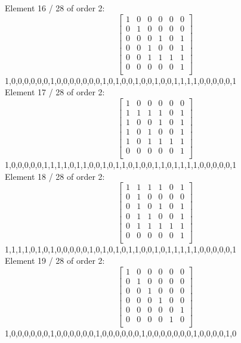 Element    16 / 28 of order 2:
$$
\left[
\begin{array}{*{6}{r}}
1 & 0 & 0 & 0 & 0 & 0\\
0 & 1 & 0 & 0 & 0 & 0\\
0 & 0 & 0 & 1 & 0 & 1\\
0 & 0 & 1 & 0 & 0 & 1\\
0 & 0 & 1 & 1 & 1 & 1\\
0 & 0 & 0 & 0 & 0 & 1\\
\end{array}
\right]
$$
1,0,0,0,0,0,0,1,0,0,0,0,0,0,0,1,0,1,0,0,1,0,0,1,0,0,1,1,1,1,0,0,0,0,0,1\\
Element    17 / 28 of order 2:
$$
\left[
\begin{array}{*{6}{r}}
1 & 0 & 0 & 0 & 0 & 0\\
1 & 1 & 1 & 1 & 0 & 1\\
1 & 0 & 0 & 1 & 0 & 1\\
1 & 0 & 1 & 0 & 0 & 1\\
1 & 0 & 1 & 1 & 1 & 1\\
0 & 0 & 0 & 0 & 0 & 1\\
\end{array}
\right]
$$
1,0,0,0,0,0,1,1,1,1,0,1,1,0,0,1,0,1,1,0,1,0,0,1,1,0,1,1,1,1,0,0,0,0,0,1\\
Element    18 / 28 of order 2:
$$
\left[
\begin{array}{*{6}{r}}
1 & 1 & 1 & 1 & 0 & 1\\
0 & 1 & 0 & 0 & 0 & 0\\
0 & 1 & 0 & 1 & 0 & 1\\
0 & 1 & 1 & 0 & 0 & 1\\
0 & 1 & 1 & 1 & 1 & 1\\
0 & 0 & 0 & 0 & 0 & 1\\
\end{array}
\right]
$$
1,1,1,1,0,1,0,1,0,0,0,0,0,1,0,1,0,1,0,1,1,0,0,1,0,1,1,1,1,1,0,0,0,0,0,1\\
Element    19 / 28 of order 2:
$$
\left[
\begin{array}{*{6}{r}}
1 & 0 & 0 & 0 & 0 & 0\\
0 & 1 & 0 & 0 & 0 & 0\\
0 & 0 & 1 & 0 & 0 & 0\\
0 & 0 & 0 & 1 & 0 & 0\\
0 & 0 & 0 & 0 & 0 & 1\\
0 & 0 & 0 & 0 & 1 & 0\\
\end{array}
\right]
$$
1,0,0,0,0,0,0,1,0,0,0,0,0,0,1,0,0,0,0,0,0,1,0,0,0,0,0,0,0,1,0,0,0,0,1,0\\
